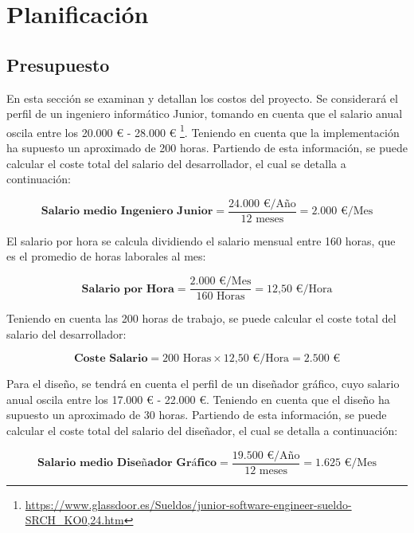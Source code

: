 \chapter{Planificación}
\section{Presupuesto}

En esta sección se examinan y detallan los costos del proyecto. Se considerará el perfil de un ingeniero informático Junior, tomando en cuenta que el salario anual oscila entre los 20.000 € - 28.000 € \footnote{\url{https://www.glassdoor.es/Sueldos/junior-software-engineer-sueldo-SRCH_KO0,24.htm}}. Teniendo en cuenta que la implementación ha supuesto un aproximado de 200 horas. Partiendo de esta información, se puede calcular el coste total del salario del desarrollador, el cual se detalla a continuación:

\begin{equation}
    \textbf{Salario medio Ingeniero Junior} =  \frac {\text{24.000 €/Año} }{ \text{12 meses}} = \text{2.000 €/Mes}
\end{equation}

El salario por hora se calcula dividiendo el salario mensual entre 160 horas, que es el promedio de horas laborales al mes:

\begin{equation}
    \textbf{Salario por Hora} = \frac {\text{2.000 €/Mes}}{160 \text{ Horas}} = \text{12,50 €/Hora}
\end{equation}

Teniendo en cuenta las 200 horas de trabajo, se puede calcular el coste total del salario del desarrollador:

\begin{equation}
    \textbf{Coste Salario} = \text{200 Horas} \times \text{12,50 €/Hora} = \text{2.500 €}
\end{equation}

Para el diseño, se tendrá en cuenta el perfil de un diseñador gráfico, cuyo salario anual oscila entre los 17.000 € - 22.000 €. Teniendo en cuenta que el diseño ha supuesto un aproximado de 30 horas. Partiendo de esta información, se puede calcular el coste total del salario del diseñador, el cual se detalla a continuación:

\begin{equation}
    \textbf{Salario medio Diseñador Gráfico} =  \frac {\text{19.500 €/Año} }{ \text{12 meses}} = \text{1.625 €/Mes}
\end{equation}

